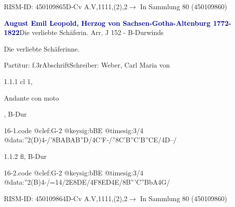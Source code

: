\documentclass[a4paper, twocolumn, 11pt]{book}
\begin{document}
\newline %
\par RISM-ID: 450109865\newline D-Cv  A.V,1111,(2),2\newline $\rightarrow$ In Sammlung 80 (450109860)
      
\par \vspace{16pt} \textcolor{darkblue}{\textbf{August Emil Leopold, Herzog von Sachsen-Gotha-Altenburg  1772-1822}}\hfillplus{[16]}\newline Die verliebte Schäferin. Arr, J 152 - B-Dur\newline winds
\par \begin{itshape} Die verliebte Schäferinne.\end{itshape} 
\par \textcolor{darkblue}{}  Partitur: f.3r\newline Abschrift\newline Schreiber: Weber, Carl Maria von
\par 1.1.1  cl 1, \begin{itshape}Andante con moto\end{itshape}, B-Dur  
\begin{filecontents*}{16-1.code}
@clef:G-2
@keysig:bBE
@timesig:3/4
@data:''2(D)4-/'{8BABAB''D}/4C'F-/''{8C'B''C'B''CE}/4D--/
\end{filecontents*}

\newline %
\par 1.1.2  fl, B-Dur  
\begin{filecontents*}{16-2.code}
@clef:G-2
@keysig:bBE
@timesig:3/4
@data:''2(B)4-/=14/2E{8DE}/4F{8ED}4E/{8B'''C''BbA}4G/
\end{filecontents*}

\newline %
\par RISM-ID: 450109864\newline D-Cv  A.V,1111,(2),2\newline $\rightarrow$ In Sammlung 80 (450109860)
      
\end{document}
